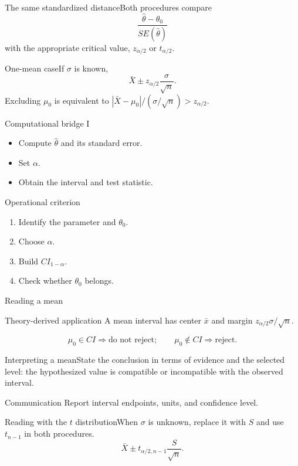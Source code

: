 \documentclass[10pt,aspectratio=169]{beamer}
\begin{document}
\begin{frame}{The same standardized distance}\small Both procedures compare
\[\frac{\hat\theta-\theta_0}{SE(\hat\theta)}\]
with the appropriate critical value, $z_{\alpha/2}$ or $t_{\alpha/2}$.\end{frame}
\begin{frame}{One-mean case}\small If $\sigma$ is known,
\[\bar X\pm z_{\alpha/2}\frac{\sigma}{\sqrt n}.\]
Excluding $\mu_0$ is equivalent to $|\bar X-\mu_0|/(\sigma/\sqrt n)>z_{\alpha/2}$.\end{frame}
\begin{frame}{Computational bridge I}\small\begin{itemize}\item Compute $\hat\theta$ and its standard error.\item Set $\alpha$.\item Obtain the interval and test statistic.\end{itemize}\end{frame}
\begin{frame}{Operational criterion}\small\begin{enumerate}\item Identify the parameter and $\theta_0$.\item Choose $\alpha$.\item Build $CI_{1-\alpha}$.\item Check whether $\theta_0$ belongs.\end{enumerate}\end{frame}
\begin{frame}{Reading a mean}\small\begin{block}{Theory-derived application} A mean interval has center $\bar x$ and margin $z_{\alpha/2}\sigma/\sqrt n$.\end{block}\[\mu_0\in CI\Rightarrow\text{do not reject};\qquad\mu_0\notin CI\Rightarrow\text{reject}.\]\end{frame}
\begin{frame}{Interpreting a mean}\small State the conclusion in terms of evidence and the selected level: the hypothesized value is compatible or incompatible with the observed interval.
\begin{alertblock}{Communication} Report interval endpoints, units, and confidence level.\end{alertblock}\end{frame}
\begin{frame}{Reading with the $t$ distribution}\small When $\sigma$ is unknown, replace it with $S$ and use $t_{n-1}$ in both procedures.
\[\bar X\pm t_{\alpha/2,n-1}\frac{S}{\sqrt n}.\]\end{frame}
\end{document}
